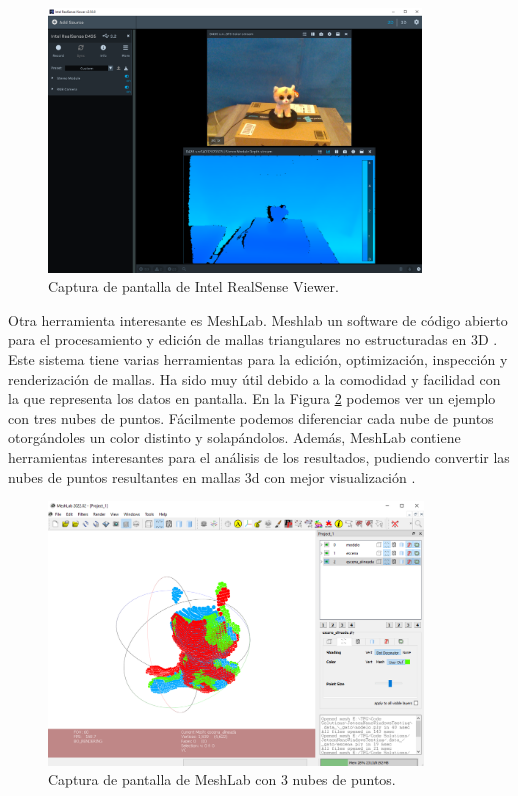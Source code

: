 \begin{figure}[h]
    \centering
    \includegraphics[height=7cm]{archivos/intel-realsense-viewer.png}
    \caption{Captura de pantalla de Intel RealSense Viewer.}
    \label{fig:realsense-viewer-ejemplo}
\end{figure}

Otra herramienta interesante es MeshLab. Meshlab un software de código abierto para el procesamiento y edición de mallas triangulares no estructuradas en 3D \citep{RCDCS13} \citep{LocalChapterEvents:ItalChap:ItalianChapConf2008:129-136}.
Este sistema tiene varias herramientas para la edición, optimización, inspección y renderización de mallas.
Ha sido muy útil debido a la comodidad y facilidad con la que representa los datos en pantalla.
En la Figura \ref{fig:meshlab-ejemplo} podemos ver un ejemplo con tres nubes de puntos.
Fácilmente podemos diferenciar cada nube de puntos otorgándoles un color distinto y solapándolos.
Además, MeshLab contiene herramientas interesantes para el análisis de los resultados, pudiendo convertir las nubes de puntos resultantes en mallas \gls{3d} con mejor visualización \citep{kazhdan2013screened}.

\begin{figure}[h]
    \centering
    \includegraphics[height=7cm]{archivos/meshlab.png}
    \caption{Captura de pantalla de MeshLab con 3 nubes de puntos.}
    \label{fig:meshlab-ejemplo}
\end{figure}


